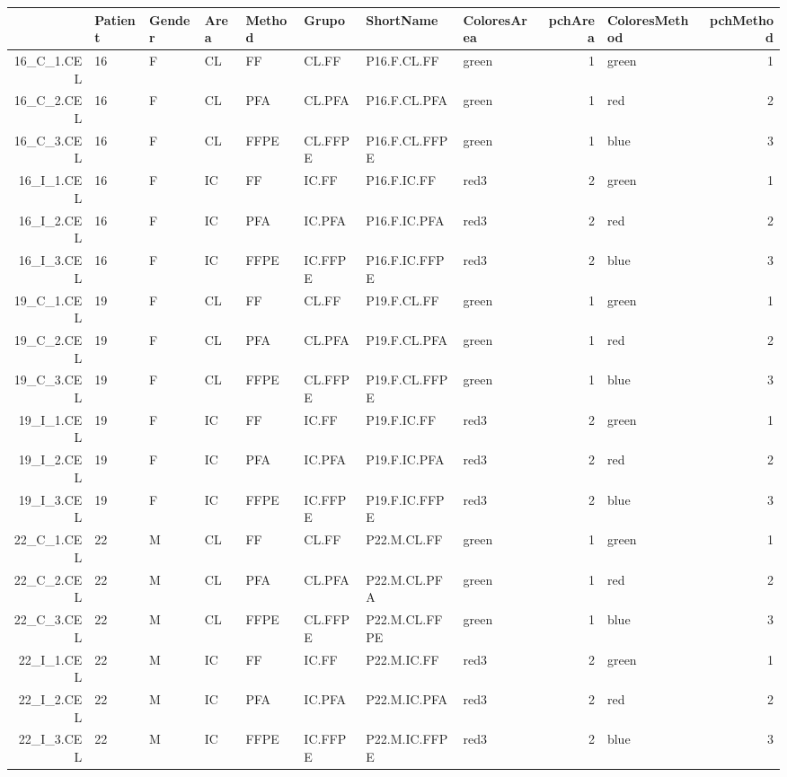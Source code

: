 \documentclass[a4paper]{article}\usepackage[]{graphicx}\usepackage[]{color}
\begin{document}
{
 \tiny
\begin{longtable}{rlllllllrlr}
  \hline
 & Patient & Gender & Area & Method & Grupo & ShortName & ColoresArea & pchArea & ColoresMethod & pchMethod \\ 
  \hline
16\_C\_1.CEL & 16 & F & CL & FF & CL.FF & P16.F.CL.FF & green &   1 & green &   1 \\ 
  16\_C\_2.CEL & 16 & F & CL & PFA & CL.PFA & P16.F.CL.PFA & green &   1 & red &   2 \\ 
  16\_C\_3.CEL & 16 & F & CL & FFPE & CL.FFPE & P16.F.CL.FFPE & green &   1 & blue &   3 \\ 
  16\_I\_1.CEL & 16 & F & IC & FF & IC.FF & P16.F.IC.FF & red3 &   2 & green &   1 \\ 
  16\_I\_2.CEL & 16 & F & IC & PFA & IC.PFA & P16.F.IC.PFA & red3 &   2 & red &   2 \\ 
  16\_I\_3.CEL & 16 & F & IC & FFPE & IC.FFPE & P16.F.IC.FFPE & red3 &   2 & blue &   3 \\ 
  19\_C\_1.CEL & 19 & F & CL & FF & CL.FF & P19.F.CL.FF & green &   1 & green &   1 \\ 
  19\_C\_2.CEL & 19 & F & CL & PFA & CL.PFA & P19.F.CL.PFA & green &   1 & red &   2 \\ 
  19\_C\_3.CEL & 19 & F & CL & FFPE & CL.FFPE & P19.F.CL.FFPE & green &   1 & blue &   3 \\ 
  19\_I\_1.CEL & 19 & F & IC & FF & IC.FF & P19.F.IC.FF & red3 &   2 & green &   1 \\ 
  19\_I\_2.CEL & 19 & F & IC & PFA & IC.PFA & P19.F.IC.PFA & red3 &   2 & red &   2 \\ 
  19\_I\_3.CEL & 19 & F & IC & FFPE & IC.FFPE & P19.F.IC.FFPE & red3 &   2 & blue &   3 \\ 
  22\_C\_1.CEL & 22 & M & CL & FF & CL.FF & P22.M.CL.FF & green &   1 & green &   1 \\ 
  22\_C\_2.CEL & 22 & M & CL & PFA & CL.PFA & P22.M.CL.PFA & green &   1 & red &   2 \\ 
  22\_C\_3.CEL & 22 & M & CL & FFPE & CL.FFPE & P22.M.CL.FFPE & green &   1 & blue &   3 \\ 
  22\_I\_1.CEL & 22 & M & IC & FF & IC.FF & P22.M.IC.FF & red3 &   2 & green &   1 \\ 
  22\_I\_2.CEL & 22 & M & IC & PFA & IC.PFA & P22.M.IC.PFA & red3 &   2 & red &   2 \\ 
  22\_I\_3.CEL & 22 & M & IC & FFPE & IC.FFPE & P22.M.IC.FFPE & red3 &   2 & blue &   3 \\ 

\end{longtable}}
\end{document}

